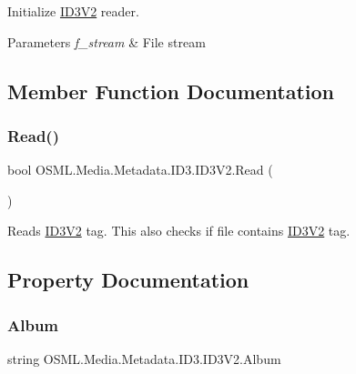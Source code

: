 Initialize \mbox{\hyperlink{classOSML_1_1Media_1_1Metadata_1_1ID3_1_1ID3V2}{I\+D3\+V2}} reader. 


\begin{DoxyParams}{Parameters}
{\em f\+\_\+stream} & File stream\\
\hline
\end{DoxyParams}


\subsection{Member Function Documentation}
\mbox{\label{classOSML_1_1Media_1_1Metadata_1_1ID3_1_1ID3V2_abd35232d1aee120b2f33ea7c8de65b76}} 
\subsubsection{\texorpdfstring{Read()}{Read()}}
{\footnotesize\ttfamily bool O\+S\+M\+L.\+Media.\+Metadata.\+I\+D3.\+I\+D3\+V2.\+Read (\begin{DoxyParamCaption}{ }\end{DoxyParamCaption})\hspace{0.3cm}{\ttfamily [inline]}}



Reads \mbox{\hyperlink{classOSML_1_1Media_1_1Metadata_1_1ID3_1_1ID3V2}{I\+D3\+V2}} tag. This also checks if file contains \mbox{\hyperlink{classOSML_1_1Media_1_1Metadata_1_1ID3_1_1ID3V2}{I\+D3\+V2}} tag. 



\subsection{Property Documentation}
\mbox{\label{classOSML_1_1Media_1_1Metadata_1_1ID3_1_1ID3V2_a69a918dd76e988e63ae800b44505c16f}} 
\subsubsection{\texorpdfstring{Album}{Album}}
{\footnotesize\ttfamily string O\+S\+M\+L.\+Media.\+Metadata.\+I\+D3.\+I\+D3\+V2.\+Album\hspace{0.3cm}{\ttfamily [get]}}




